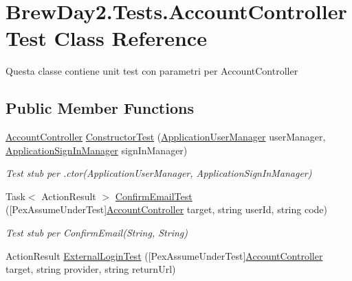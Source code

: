 \hypertarget{class_brew_day2_1_1_tests_1_1_account_controller_test}{}\section{Brew\+Day2.\+Tests.\+Account\+Controller\+Test Class Reference}
\label{class_brew_day2_1_1_tests_1_1_account_controller_test}


Questa classe contiene unit test con parametri per Account\+Controller 


\subsection*{Public Member Functions}
\begin{DoxyCompactItemize}
\item 
\mbox{\hyperlink{class_brew_day2_1_1_controllers_1_1_account_controller}{Account\+Controller}} \mbox{\hyperlink{class_brew_day2_1_1_tests_1_1_account_controller_test_a0bf43e2f6dcae601f8139a1420bd2e69}{Constructor\+Test}} (\mbox{\hyperlink{class_brew_day2_1_1_application_user_manager}{Application\+User\+Manager}} user\+Manager, \mbox{\hyperlink{class_brew_day2_1_1_application_sign_in_manager}{Application\+Sign\+In\+Manager}} sign\+In\+Manager)
\begin{DoxyCompactList}\small\item\em Test stub per .ctor(\+Application\+User\+Manager, Application\+Sign\+In\+Manager)\end{DoxyCompactList}\item 
Task$<$ Action\+Result $>$ \mbox{\hyperlink{class_brew_day2_1_1_tests_1_1_account_controller_test_aa905022faa912fd82b84ed93e719f43d}{Confirm\+Email\+Test}} (\mbox{[}Pex\+Assume\+Under\+Test\mbox{]}\mbox{\hyperlink{class_brew_day2_1_1_controllers_1_1_account_controller}{Account\+Controller}} target, string user\+Id, string code)
\begin{DoxyCompactList}\small\item\em Test stub per Confirm\+Email(\+String, String)\end{DoxyCompactList}\item 
Action\+Result \mbox{\hyperlink{class_brew_day2_1_1_tests_1_1_account_controller_test_a732497850168a7e099f6a11074c051ed}{External\+Login\+Test}} (\mbox{[}Pex\+Assume\+Under\+Test\mbox{]}\mbox{\hyperlink{class_brew_day2_1_1_controllers_1_1_account_controller}{Account\+Controller}} target, string provider, string return\+Url)

\end{DoxyCompactItemize}
